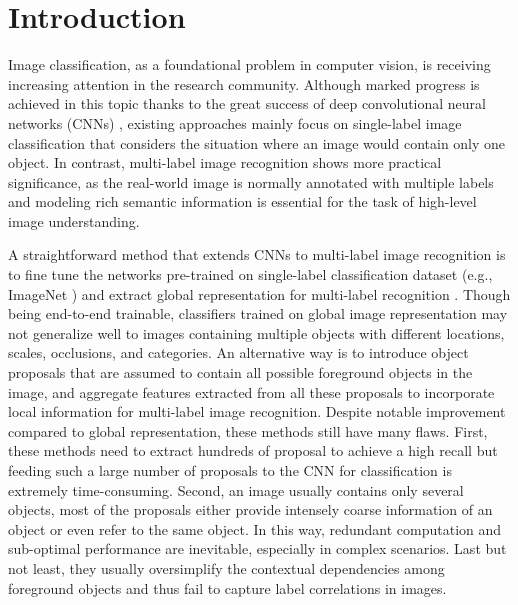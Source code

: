 \documentclass[letterpaper]{article} %
\begin{document}
\section{Introduction}
Image classification, as a foundational problem in computer vision, is receiving increasing attention in the research community. Although marked progress is achieved in this topic thanks to the great success of deep convolutional neural networks (CNNs) \cite{krizhevsky2012imagenet,he2016deep}, existing approaches mainly focus on single-label image classification that considers the situation where an image would contain only one object. In contrast, multi-label image recognition shows more practical significance, as the real-world image is normally annotated with multiple labels and modeling rich semantic information is essential for the task of high-level image understanding.

A straightforward method that extends CNNs to multi-label image recognition is to fine tune the networks pre-trained on single-label classification dataset (e.g.,  ImageNet \cite{russakovsky2015imagenet}) and extract global representation for multi-label recognition \cite{chatfield2014return}. Though being end-to-end trainable, classifiers trained on global image representation may not generalize well to images containing multiple objects with different locations, scales, occlusions, and categories. An alternative way \cite{yang2016exploit,wei2016hcp} is to introduce object proposals that are assumed to contain all possible foreground objects in the image, and aggregate features extracted from all these proposals to incorporate local information for multi-label image recognition. Despite notable improvement compared to global representation, these methods still have many flaws. First, these methods need to extract hundreds of proposal to achieve a high recall but feeding such a large number of proposals to the CNN for classification is extremely time-consuming. Second, an image usually contains only several objects, most of the proposals either provide intensely coarse information of an object or even refer to the same object. In this way, redundant computation and sub-optimal performance are inevitable, especially in complex scenarios. Last but not least, they usually oversimplify the contextual dependencies among foreground objects and thus fail to capture label correlations in images.
\end{document}
